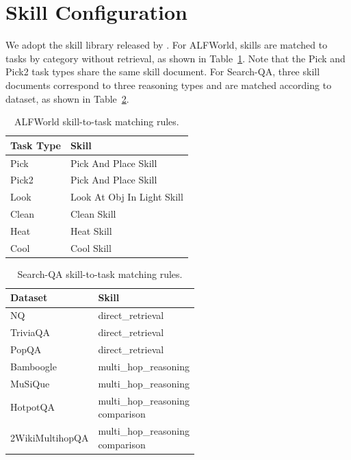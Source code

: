 \section{Skill Configuration}
\label{app:skill}

We adopt the skill library released by \citet{Xia2026SkillRL}. For ALFWorld, skills are matched to tasks by category without retrieval, as shown in Table~\ref{tab:skill_alf}. Note that the Pick and Pick2 task types share the same skill document. For Search-QA, three skill documents correspond to three reasoning types and are matched according to dataset, as shown in Table~\ref{tab:skill_search}.

\begin{table}[h]
\centering
\small
\setlength{\tabcolsep}{5pt}
\renewcommand{\arraystretch}{1.1}
\caption{ALFWorld skill-to-task matching rules.}
\label{tab:skill_alf}
\begin{tabular}{ll}
\toprule
\textbf{Task Type} & \textbf{Skill} \\
\midrule
Pick & Pick And Place Skill \\
Pick2 & Pick And Place Skill \\
\midrule
Look & Look At Obj In Light Skill \\
Clean & Clean Skill \\
Heat & Heat Skill \\
Cool & Cool Skill \\
\bottomrule
\end{tabular}
\end{table}

\begin{table}[h]
\centering
\small
\setlength{\tabcolsep}{5pt}
\renewcommand{\arraystretch}{1.1}
\caption{Search-QA skill-to-task matching rules.}
\label{tab:skill_search}
\begin{tabular}{ll}
\toprule
\textbf{Dataset} & \textbf{Skill} \\
\midrule
NQ & direct\_retrieval \\
TriviaQA & direct\_retrieval \\
PopQA & direct\_retrieval \\
\midrule
Bamboogle & multi\_hop\_reasoning \\
MuSiQue & multi\_hop\_reasoning \\
\midrule
HotpotQA & \makecell[l]{multi\_hop\_reasoning \\ comparison} \\
2WikiMultihopQA & \makecell[l]{multi\_hop\_reasoning \\ comparison} \\
\bottomrule
\end{tabular}
\end{table}
